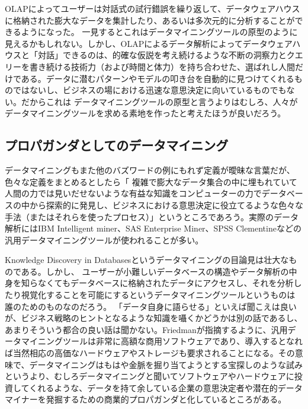 OLAPによってユーザーは対話式の試行錯誤を繰り返して、データウェアハウスに格納された膨大なデータを集計したり、あるいは多次元的に分析することができるようになった。
一見するとこれはデータマイニングツールの原型のように見えるかもしれない。しかし、OLAPによるデータ解析によってデータウェアハウスと「対話」できるのは、的確な仮説を考え続けるような不断の洞察力とクエリーを書き続ける技術力（および時間と体力）を持ち合わせた、選ばれし人間だけである。データに潜むパターンやモデルの叩き台を自動的に見つけてくれるものではないし、ビジネスの場における迅速な意思決定に向いているものでもない。だからこれは
データマイニングツールの原型と言うよりはむしろ、人々がデータマイニングツールを求める素地を作ったと考えたほうが良いだろう。

\subsection{プロパガンダとしてのデータマイニング}
データマイニングもまた他のバズワードの例にもれず定義が曖昧な言葉だが、色々な定義をまとめるとしたら「
複雑で膨大なデータ集合の中に埋もれていて人間の力では見いだせないような有益な知識をコンピューターの力でデータベースの中から探索的に発見し、ビジネスにおける意思決定に役立てるような色々な手法（またはそれらを使ったプロセス）」というところであろう。実際のデータ解析にはIBM Intelligent miner、SAS Enterprise Miner、SPSS Clementineなどの汎用データマイニングツールが使われることが多い。

Knowledge Discovery in Databasesというデータマイニングの目論見は壮大なものである。しかし、
ユーザーが小難しいデータベースの構造やデータ解析の中身を知らなくてもデータベースに格納されたデータにアクセスし、それを分析したり視覚化することを可能にするというデータマイニングツールというものは
誰のためのものなのだろう。
「データ自身に語らせる」といえば聞こえは良いが、ビジネス戦略のヒントとなるような知識を囁くかどうかは別の話であるし、あまりそういう都合の良い話は聞かない。Friedmanが指摘するように、汎用データマイニングツールは非常に高額な商用ソフトウェアであり、導入するとなれば当然相応の高価なハードウェアやストレージも要求されることになる。その意味で、データマイニングはもはや金脈を掘り当てようとする宝探しのような試みというより、むしろデータマイニングと聞いてソフトウェアやハードウェアに投資してくれるような、データを持て余している企業の意思決定者や潜在的データマイナーを発掘するための商業的プロパガンダと化しているところがある。

